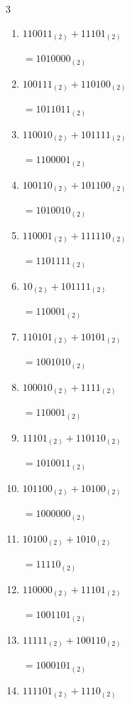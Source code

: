 \begin{multicols}{3}
\begin{enumerate}
  \item $110011_{(2)} + 11101_{(2)}$

        $=1010000_{(2)}$

  \item $100111_{(2)} + 110100_{(2)}$

        $=1011011_{(2)}$

  \item $110010_{(2)} + 101111_{(2)}$

        $=1100001_{(2)}$

\columnbreak %

  \item $100110_{(2)} + 101100_{(2)}$

        $=1010010_{(2)}$

  \item $110001_{(2)} + 111110_{(2)}$

        $=1101111_{(2)}$

  \item $10_{(2)} + 101111_{(2)}$

        $=110001_{(2)}$

  \item $110101_{(2)} + 10101_{(2)}$

        $=1001010_{(2)}$

  \item $100010_{(2)} + 1111_{(2)}$

        $=110001_{(2)}$

  \item $11101_{(2)} + 110110_{(2)}$

        $=1010011_{(2)}$

  \item $101100_{(2)} + 10100_{(2)}$

        $=1000000_{(2)}$

  \item $10100_{(2)} + 1010_{(2)}$

        $=11110_{(2)}$

  \item $110000_{(2)} + 11101_{(2)}$

        $=1001101_{(2)}$

  \item $11111_{(2)} + 100110_{(2)}$

        $=1000101_{(2)}$

\columnbreak %

\resetques

  \item $111101_{(2)} + 1110_{(2)}$


\end{enumerate}
\end{multicols}
